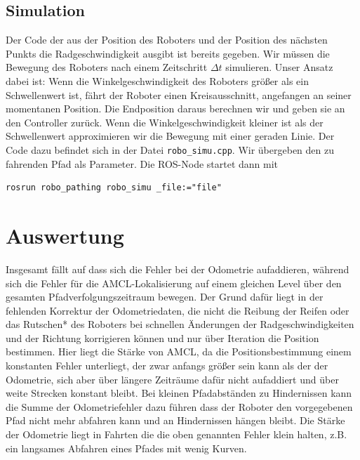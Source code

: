 \documentclass[11pt,a4paper]{article}
\begin{document}
\subsection*{Simulation}
Der Code der aus der Position des Roboters und der Position des nächsten Punkts die Radgeschwindigkeit ausgibt
ist bereits gegeben. Wir müssen die Bewegung des Roboters nach einem Zeitschritt $\Delta t$ simulieren.
Unser Ansatz dabei ist: Wenn die Winkelgeschwindigkeit des Roboters größer als ein Schwellenwert ist, fährt der Roboter einen 
Kreisausschnitt, angefangen an seiner momentanen Position. Die Endposition daraus berechnen wir und
geben sie an den Controller zurück. Wenn die Winkelgeschwindigkeit kleiner ist als der Schwellenwert
approximieren wir die Bewegung mit einer geraden Linie. Der Code dazu befindet sich in der Datei \verb|robo_simu.cpp|.
Wir übergeben den zu fahrenden Pfad als Parameter. Die ROS-Node startet dann mit \begin{verbatim}
rosrun robo_pathing robo_simu _file:="file"
\end{verbatim}
\newpage

\section{Auswertung}
Insgesamt fällt auf dass sich die Fehler bei der Odometrie aufaddieren, während sich die Fehler für die AMCL-Lokalisierung
auf einem gleichen Level über den gesamten Pfadverfolgungszeitraum bewegen. Der Grund dafür liegt in der fehlenden Korrektur der Odometriedaten, die 
nicht die Reibung der Reifen oder das Rutschen* des Roboters bei schnellen Änderungen der Radgeschwindigkeiten und der Richtung korrigieren können und nur über Iteration die Position bestimmen.
Hier liegt die Stärke von AMCL, da die Positionsbestimmung einem konstanten Fehler unterliegt, der zwar anfangs größer sein kann als der der Odometrie,
sich aber über längere Zeiträume dafür nicht aufaddiert und über weite Strecken konstant bleibt. Bei kleinen Pfadabständen zu Hindernissen kann die Summe der Odometriefehler dazu führen dass 
der Roboter den vorgegebenen Pfad nicht mehr abfahren kann und an Hindernissen hängen bleibt. Die Stärke der Odometrie liegt in Fahrten 
die die oben genannten Fehler klein halten, z.B. ein langsames Abfahren eines Pfades mit wenig Kurven.


\end{document}
